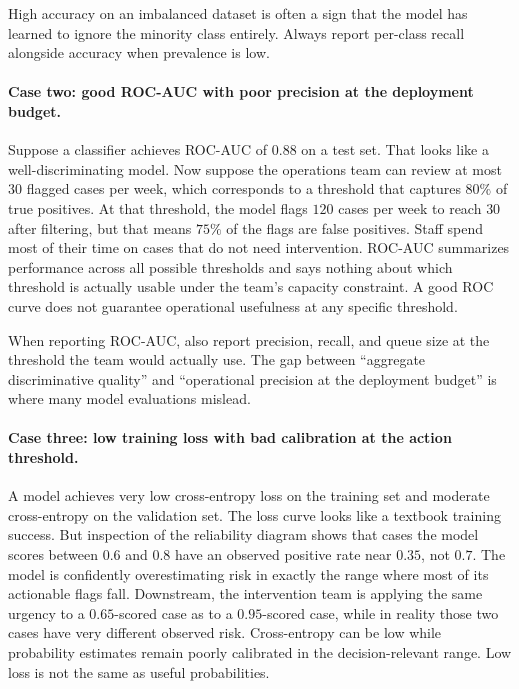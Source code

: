 \begin{failurebox}
High accuracy on an imbalanced dataset is often a sign that the model has learned to ignore the minority class entirely. Always report per-class recall alongside accuracy when prevalence is low.
\end{failurebox}

\paragraph{Case two: good ROC-AUC with poor precision at the deployment budget.} Suppose a classifier achieves ROC-AUC of $0.88$ on a test set. That looks like a well-discriminating model. Now suppose the operations team can review at most $30$ flagged cases per week, which corresponds to a threshold that captures $80\%$ of true positives. At that threshold, the model flags $120$ cases per week to reach $30$ after filtering, but that means $75\%$ of the flags are false positives. Staff spend most of their time on cases that do not need intervention. ROC-AUC summarizes performance across all possible thresholds and says nothing about which threshold is actually usable under the team's capacity constraint. A good ROC curve does not guarantee operational usefulness at any specific threshold.

\begin{practicalnote}
When reporting ROC-AUC, also report precision, recall, and queue size at the threshold the team would actually use. The gap between ``aggregate discriminative quality'' and ``operational precision at the deployment budget'' is where many model evaluations mislead.
\end{practicalnote}

\paragraph{Case three: low training loss with bad calibration at the action threshold.} A model achieves very low cross-entropy loss on the training set and moderate cross-entropy on the validation set. The loss curve looks like a textbook training success. But inspection of the reliability diagram shows that cases the model scores between $0.6$ and $0.8$ have an observed positive rate near $0.35$, not $0.7$. The model is confidently overestimating risk in exactly the range where most of its actionable flags fall. Downstream, the intervention team is applying the same urgency to a $0.65$-scored case as to a $0.95$-scored case, while in reality those two cases have very different observed risk. Cross-entropy can be low while probability estimates remain poorly calibrated in the decision-relevant range. Low loss is not the same as useful probabilities.

